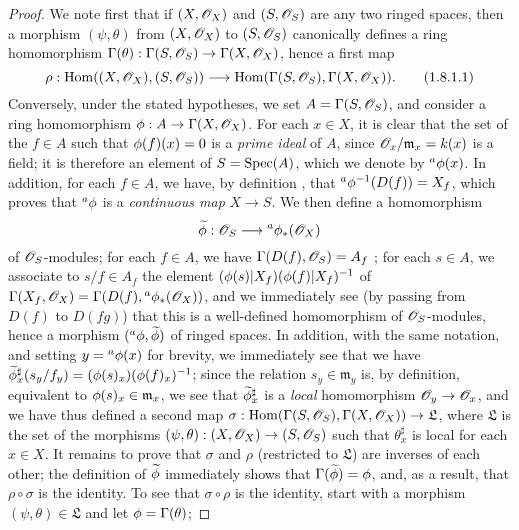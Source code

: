 \begin{proof}
\label{proof-1.1.8.1}
We note first that if $(X,\mathscr{O}_X)$ and $(S,\mathscr{O}_S)$ are any two ringed spaces, then a morphism $(\psi,\theta)$ from $(X,\mathscr{O}_X)$ to $(S,\mathscr{O}_S)$ canonically defines a ring homomorphism $\Gamma(\theta):\Gamma(S,\sh{O}_S)\to\Gamma(X,\sh{O}_X)$, hence a first map
\[
  \label{1.1.8.1.1}
  \rho:\Hom((X,\sh{O}_X),(S,\sh{O}_S))\to\Hom(\Gamma(S,\sh{O}_S),\Gamma(X,\sh{O}_X)).
  \tag{1.8.1.1}
\]
Conversely, under the stated hypotheses, we set $A=\Gamma(S,\mathscr{O}_S)$, and consider a ring homomorphism $\vphi:A\to\Gamma(X,\sh{O}_X)$.
For each $x\in X$, it is clear that the set of the $f\in A$ such that $\phi(f)(x)=0$ is a \emph{prime ideal} of $A$, since $\mathscr{O}_x/\mathfrak{m}_x=k(x)$ is a field;
it is therefore an element of $S=\operatorname{Spec}(A)$, which we denote by ${}^a\phi(x)$.
  In addition, for each $f\in A$, we have, by definition , that ${}^a\phi^{-1}(D(f))=X_f$, which proves that ${}^a\phi$ is a \emph{continuous map} $X\to S$.
We then define a homomorphism
\[
  \widetilde{\vphi}:\sh{O}_S\to{}^a\vphi_*(\sh{O}_X)
\]
of $\mathscr{O}_S$-modules;
for each $f\in A$, we have $\Gamma(D(f),\mathscr{O}_S)=A_f$ ;
for each $s\in A$, we associate to $s/f\in A_f$ the element $(\phi(s)|X_f)(\phi(f)|X_f)^{-1}$ of $\Gamma(X_f,\mathscr{O}_X)=\Gamma(D(f),{}^a\phi_*(\mathscr{O}_X))$, and we immediately see (by passing from $D(f)$ to $D(fg)$) that this is a well-defined homomorphism of $\mathscr{O}_S$-modules, hence a morphism $({}^a\phi,\widetilde{\phi})$ of ringed spaces.
In addition, with the same notation, and setting $y={}^a\phi(x)$ for brevity, we immediately see  that we have $\widetilde{\phi}_x^\sharp(s_y/f_y)=(\phi(s)_x)(\phi(f)_x)^{-1}$;
since the relation $s_y\in\mathfrak{m}_y$ is, by definition, equivalent to $\phi(s)_x\in\mathfrak{m}_x$, we see that $\widetilde{\phi}_x^\sharp$ is a \emph{local} homomorphism $\sh{O}_y\to\sh{O}_x$, and we have thus defined a second map $\sigma:\Hom(\Gamma(S,\sh{O}_S),\Gamma(X,\sh{O}_X))\to\mathfrak{L}$, where $\mathfrak{L}$ is the set of the morphisms $(\psi,\theta):(X,\sh{O}_X)\to(S,\sh{O}_S)$ such that $\theta_x^\sharp$ is local for each $x\in X$.
It remains to prove that $\sigma$ and $\rho$ (restricted to $\mathfrak{L}$) are inverses of each other;
the definition of $\widetilde{\phi}$ immediately shows that $\Gamma(\widetilde{\phi})=\phi$, and, as a result, that $\rho\circ\sigma$ is the identity.
To see that $\sigma\circ\rho$ is the identity, start with a morphism $(\psi,\theta)\in\mathfrak{L}$ and let $\phi=\Gamma(\theta)$;

\end{proof}
